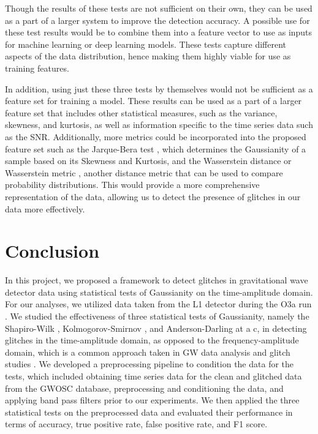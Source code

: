 \documentclass[12pt]{article}
\begin{document}
\medskip
\noindent Though the results of these tests are not sufficient on their own, they can be used as a part of a larger system to improve the detection accuracy. A possible use for these test results would be to combine them into a feature vector to use as inputs for machine learning or deep learning models. These tests capture different aspects of the data distribution, hence making them highly viable for use as training features.

\medskip
\noindent In addition, using just these three tests by themselves would not be sufficient as a feature set for training a model. These results can be used as a part of a larger feature set that includes other statistical measures, such as the variance, skewness, and kurtosis, as well as information specific to the time series data such as the SNR. Additionally, more metrics could be incorporated into the proposed feature set such as the Jarque-Bera test \cite{JarqueBera1987}, which determines the Gaussianity of a sample based on its Skewness and Kurtosis, and the Wasserstein distance or Wasserstein metric \cite{Panaretos_2019}, another distance metric that can be used to compare probability distributions. This would provide a more comprehensive representation of the data, allowing us to detect the presence of glitches in our data more effectively.



\section{Conclusion}\label{Conclusions}

\noindent In this project, we proposed a framework to detect glitches in gravitational wave detector data using statistical tests of Gaussianity on the time-amplitude domain. For our analyses, we utilized data taken from the L1 detector during the O3a run \cite{abbott_gwtc-2_2021}. We studied the effectiveness of three statistical tests of Gaussianity, namely the Shapiro-Wilk \cite{Shapiro1965}, Kolmogorov-Smirnov \cite{Kolmogorov_1951}, and Anderson-Darling \cite{anderson1954test} at a c, in detecting glitches in the time-amplitude domain, as opposed to the frequency-amplitude domain, which is a common approach taken in GW data analysis and glitch studies \cite{chatterji_multiresolution_2004, vazsonyi_identifying_2023}. We developed a preprocessing pipeline to condition the data for the tests, which included obtaining time series data for the clean and glitched data from the GWOSC database, preprocessing and conditioning the data, and applying band pass filters prior to our experiments. We then applied the three statistical tests on the preprocessed data and evaluated their performance in terms of accuracy, true positive rate, false positive rate, and F1 score.
\end{document}
